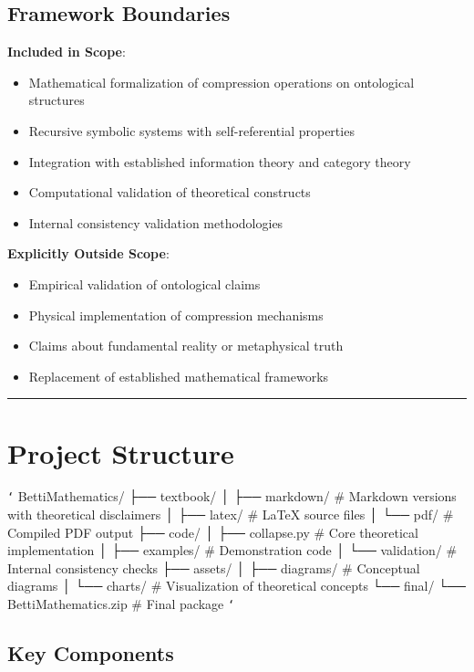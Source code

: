 \subsection{Framework Boundaries}
\textbf{Included in Scope}:
\begin{itemize}
\item Mathematical formalization of compression operations on ontological structures
\item Recursive symbolic systems with self-referential properties
\item Integration with established information theory and category theory
\item Computational validation of theoretical constructs
\item Internal consistency validation methodologies
\end{itemize}

\textbf{Explicitly Outside Scope}:
\begin{itemize}
\item Empirical validation of ontological claims
\item Physical implementation of compression mechanisms
\item Claims about fundamental reality or metaphysical truth
\item Replacement of established mathematical frameworks
\end{itemize}

\hrule

\section{Project Structure}

\texttt{`}
BettiMathematics/
├── textbook/
│   ├── markdown/               \# Markdown versions with theoretical disclaimers
│   ├── latex/                  \# LaTeX source files
│   └── pdf/                    \# Compiled PDF output
├── code/
│   ├── collapse.py             \# Core theoretical implementation
│   ├── examples/               \# Demonstration code
│   └── validation/             \# Internal consistency checks
├── assets/
│   ├── diagrams/               \# Conceptual diagrams
│   └── charts/                 \# Visualization of theoretical concepts
└── final/
    └── BettiMathematics.zip    \# Final package
\texttt{`}

\subsection{Key Components}

